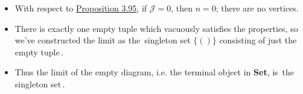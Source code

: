 \begin{itemize}
    \item  With respect to \hyperref[P3.95]{Proposition 3.95}, if $\mathcal{J}=0$, then $n=0$; there are no vertices.
    \item There is exactly one empty tuple which vacuously satisfies the properties, so we've constructed the limit as the \,singleton set $\{()\}$ consisting of just the empty tuple\,.
    \item Thus the limit of the empty diagram, i.e. the terminal object in \textbf{Set}, is \,the singleton set\,.

  \end{itemize}